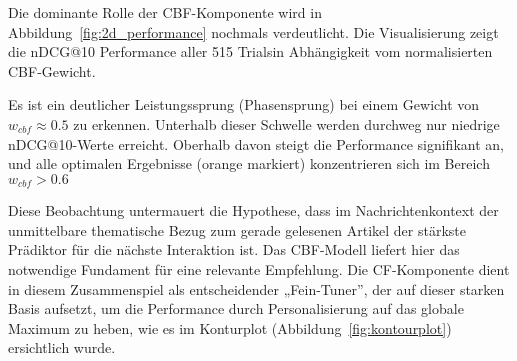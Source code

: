 Die dominante Rolle der \ac{CBF}-Komponente wird in Abbildung~\ref{fig:2d_performance} nochmals verdeutlicht. Die 
Visualisierung zeigt die \ac{nDCG}@10 Performance aller 515 Trialsin Abhängigkeit vom normalisierten \ac{CBF}-Gewicht.

Es ist ein deutlicher Leistungssprung (Phasensprung) bei einem Gewicht von \(w_{cbf} \approx 0.5\) zu erkennen.
Unterhalb dieser Schwelle werden durchweg nur niedrige \ac{nDCG}@10-Werte erreicht. Oberhalb davon steigt die Performance 
signifikant an, und alle optimalen Ergebnisse (orange markiert) konzentrieren sich im Bereich \(w_{cbf} > 0.6\)

Diese Beobachtung untermauert die Hypothese, dass im Nachrichtenkontext der unmittelbare thematische Bezug zum 
gerade gelesenen Artikel der stärkste Prädiktor für die nächste Interaktion ist. 
Das CBF-Modell liefert hier das notwendige Fundament für eine relevante Empfehlung. 
Die CF-Komponente dient in diesem Zusammenspiel als entscheidender „Fein-Tuner”, der auf dieser starken Basis aufsetzt, 
um die Performance durch Personalisierung auf das globale Maximum zu heben, wie es im Konturplot (Abbildung~\ref{fig:kontourplot}) 
ersichtlich wurde.


% 